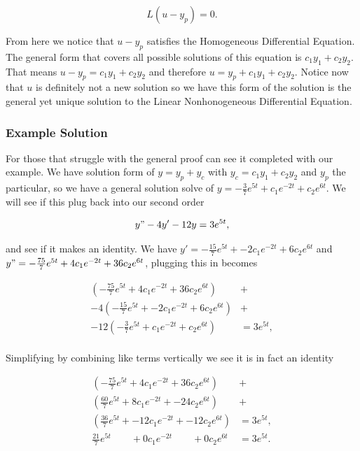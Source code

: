 \documentclass[12pt]{article}
\begin{document}
\begin{equation*}
    L(u-y_p) = 0.
\end{equation*}

From here we notice that $u-y_p$ satisfies the Homogeneous Differential Equation. The general form that covers all possible solutions of this equation is $c_1y_1+c_2y_2$. That means $u-y_p=c_1y_1+c_2y_2$ and therefore $u=y_p+c_1y_1+c_2y_2$. Notice now that $u$ is definitely not a new solution so we have this form of the solution is the general yet unique solution to the Linear Nonhonogeneous Differential Equation.

\subsubsection{Example Solution}

For those that struggle with the general proof can see it completed with our example. We have solution form of $y=y_p+y_c$ with $y_c=c_1y_1+c_2y_2$ and $y_p$ the particular, so we have a general solution solve of $y=-\frac{3}{7}e^{5t}+c_1e^{-2t} + c_2e^{6t}$. We will see if this plug back into our second order

\begin{equation*}
    y"-4y'-12y = 3e^{5t},
\end{equation*}

and see if it makes an identity. We have $y'=-\frac{15}{7}e^{5t}+-2c_1e^{-2t}+6c_2e^{6t}$ and $y"=-\frac{75}{7}e^{5t}+4c_1e^{-2t}+36c_2e^{6t}$, plugging this in becomes

\begin{align*}
    \left(-\frac{75}{7}e^{5t}+4c_1e^{-2t}+36c_2e^{6t} \right)& + \\
    -4\left(-\frac{15}{7}e^{5t}+-2c_1e^{-2t}+6c_2e^{6t} \right)& + \\
    -12\left(-\frac{3}{7}e^{5t}+c_1e^{-2t} + c_2e^{6t} \right)& = 3e^{5t}, \\
\end{align*}

Simplifying by combining like terms vertically we see it is in fact an identity

\begin{align*}
    \left(-\frac{75}{7}e^{5t}+4c_1e^{-2t}+36c_2e^{6t} \right)& + \\
    \left(\frac{60}{7}e^{5t}+8c_1e^{-2t}+-24c_2e^{6t} \right)& + \\
    \left(\frac{36}{7}e^{5t}+-12c_1e^{-2t} +-12c_2e^{6t} \right)& = 3e^{5t}, \\
    \frac{21}{7}e^{5t}\qquad +0c_1e^{-2t}  \qquad +0c_2e^{6t}& = 3e^{5t}.
\end{align*}
\end{document}
